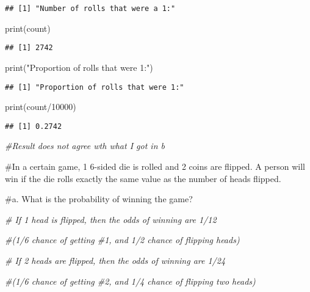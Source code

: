 \documentclass[
]{article}
\newenvironment{Shaded}{\begin{snugshade}}{\end{snugshade}}
\newcommand{\CommentTok}[1]{\textcolor[rgb]{0.56,0.35,0.01}{\textit{#1}}}
\newcommand{\DecValTok}[1]{\textcolor[rgb]{0.00,0.00,0.81}{#1}}
\newcommand{\FunctionTok}[1]{\textcolor[rgb]{0.00,0.00,0.00}{#1}}
\newcommand{\NormalTok}[1]{#1}
\newcommand{\SpecialCharTok}[1]{\textcolor[rgb]{0.00,0.00,0.00}{#1}}
\newcommand{\StringTok}[1]{\textcolor[rgb]{0.31,0.60,0.02}{#1}}
\begin{document}
\begin{verbatim}
## [1] "Number of rolls that were a 1:"
\end{verbatim}

\begin{Shaded}
\begin{Highlighting}[]
\FunctionTok{print}\NormalTok{(count)}
\end{Highlighting}
\end{Shaded}

\begin{verbatim}
## [1] 2742
\end{verbatim}

\begin{Shaded}
\begin{Highlighting}[]
\FunctionTok{print}\NormalTok{(}\StringTok{"Proportion of rolls that were 1:"}\NormalTok{)}
\end{Highlighting}
\end{Shaded}

\begin{verbatim}
## [1] "Proportion of rolls that were 1:"
\end{verbatim}

\begin{Shaded}
\begin{Highlighting}[]
\FunctionTok{print}\NormalTok{(count}\SpecialCharTok{/}\DecValTok{10000}\NormalTok{)}
\end{Highlighting}
\end{Shaded}

\begin{verbatim}
## [1] 0.2742
\end{verbatim}

\begin{Shaded}
\begin{Highlighting}[]
\CommentTok{\#Result does not agree wth what I got in b}
\end{Highlighting}
\end{Shaded}

\#In a certain game, 1 6-sided die is rolled and 2 coins are flipped. A
person will win if the die rolls exactly the same value as the number of
heads flipped.

\#a. What is the probability of winning the game?

\begin{Shaded}
\begin{Highlighting}[]
\CommentTok{\# If 1 head is flipped, then the odds of winning are 1/12}

\CommentTok{\#(1/6 chance of getting \#1, and 1/2 chance of flipping heads)}

\CommentTok{\# If 2 heads are flipped, then the odds of winning are 1/24}

\CommentTok{\#(1/6 chance of getting \#2, and 1/4 chance of flipping two heads)}
\end{Highlighting}
\end{Shaded}
\end{document}
